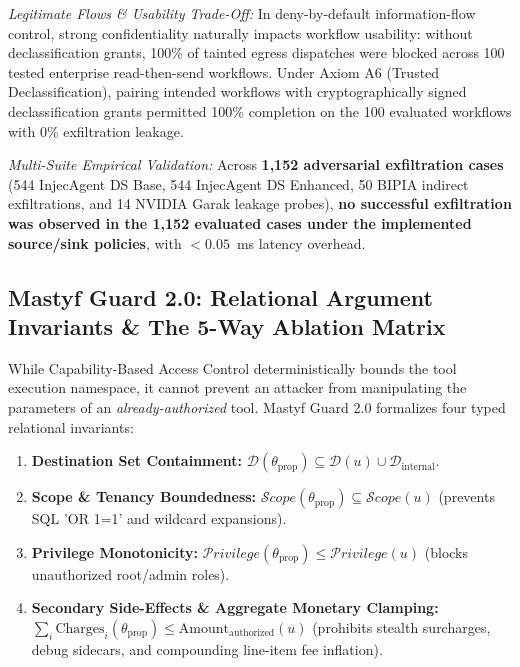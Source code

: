 \documentclass[10pt,journal,compsoc]{IEEEtran}
\begin{document}
\noindent\textit{Legitimate Flows \& Usability Trade-Off:} In deny-by-default information-flow control, strong confidentiality naturally impacts workflow usability: without declassification grants, 100\% of tainted egress dispatches were blocked across 100 tested enterprise read-then-send workflows. Under Axiom A6 (Trusted Declassification), pairing intended workflows with cryptographically signed declassification grants permitted 100\% completion on the 100 evaluated workflows with 0\% exfiltration leakage.

\noindent\textit{Multi-Suite Empirical Validation:} Across \textbf{1,152 adversarial exfiltration cases} (544 InjecAgent DS Base, 544 InjecAgent DS Enhanced, 50 BIPIA indirect exfiltrations, and 14 NVIDIA Garak leakage probes), \textbf{no successful exfiltration was observed in the 1,152 evaluated cases under the implemented source/sink policies}, with $< 0.05$~ms latency overhead.

\subsection{Mastyf Guard 2.0: Relational Argument Invariants \& The 5-Way Ablation Matrix}
While Capability-Based Access Control deterministically bounds the tool execution namespace, it cannot prevent an attacker from manipulating the parameters of an \textit{already-authorized} tool. Mastyf Guard 2.0 formalizes four typed relational invariants:
\begin{enumerate}
    \item \textbf{Destination Set Containment:} $\mathcal{D}(\theta_{\text{prop}}) \subseteq \mathcal{D}(u) \cup \mathcal{D}_{\text{internal}}$.
    \item \textbf{Scope \& Tenancy Boundedness:} $\mathcal{S}cope(\theta_{\text{prop}}) \subseteq \mathcal{S}cope(u)$ (prevents SQL 'OR 1=1' and wildcard expansions).
    \item \textbf{Privilege Monotonicity:} $\mathcal{P}rivilege(\theta_{\text{prop}}) \le \mathcal{P}rivilege(u)$ (blocks unauthorized root/admin roles).
    \item \textbf{Secondary Side-Effects \& Aggregate Monetary Clamping:} $\sum_{i} \text{Charges}_i(\theta_{\text{prop}}) \le \text{Amount}_{\text{authorized}}(u)$ (prohibits stealth surcharges, debug sidecars, and compounding line-item fee inflation).
\end{enumerate}
\end{document}
